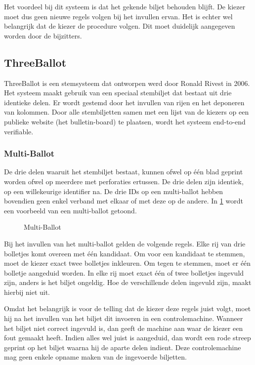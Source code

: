\npar Het voordeel bij dit systeem is dat het gekende biljet behouden blijft. De kiezer moet dus geen nieuwe regels volgen bij het invullen ervan. Het is echter wel belangrijk dat de kiezer de procedure volgen. Dit moet duidelijk aangegeven worden door de bijzitters.

\subsection{ThreeBallot~\cite{rivest_threeballot}}
\label{sec:ls:threeballot}

ThreeBallot is een stemsysteem dat ontworpen werd door Ronald Rivest in 2006. Het systeem maakt gebruik van een speciaal stembiljet dat bestaat uit drie identieke delen. Er wordt gestemd door het invullen van rijen en het deponeren van kolommen. Door alle stembiljetten samen met een lijst van de kiezers op een publieke website (het bulletin-board) te plaatsen, wordt het systeem end-to-end verifiable.

\subsubsection{Multi-Ballot}
\label{sec:ls:multi-ballot}

De drie delen waaruit het stembiljet bestaat, kunnen ofwel op één blad geprint worden ofwel op meerdere met perforaties ertussen. De drie delen zijn identiek, op een willekeurige identifier na. De drie IDs op een multi-ballot hebben bovendien geen enkel verband met elkaar of met deze op de andere. In \ref{fig:ls:threeballot} wordt een voorbeeld van een multi-ballot getoond.

\begin{figure}
  \caption{Multi-Ballot\cite{rivest_threeballot}}
  \label{fig:ls:threeballot}
\end{figure}

\npar Bij het invullen van het multi-ballot gelden de volgende regels. Elke rij van drie bolletjes komt overeen met \'e\'en kandidaat. Om voor een kandidaat te stemmen, moet de kiezer exact twee bolletjes inkleuren. Om tegen te stemmen, moet er \'e\'en bolletje aangeduid worden. In elke rij moet exact \'e\'en of twee bolletjes ingevuld zijn, anders is het biljet ongeldig. Hoe de verschillende delen ingevuld zijn, maakt hierbij niet uit.

\npar Omdat het belangrijk is voor de telling dat de kiezer deze regels juist volgt, moet hij na het invullen van het biljet dit invoeren in een controlemachine. Wanneer het biljet niet correct ingevuld is, dan geeft de machine aan waar de kiezer een fout gemaakt heeft. Indien alles wel juist is aangeduid, dan wordt een rode streep geprint op het biljet waarna hij de aparte delen indient. Deze controlemachine mag geen enkele opname maken van de ingevoerde biljetten.

